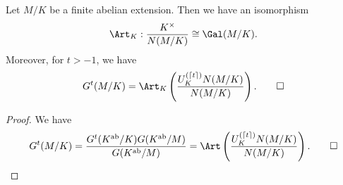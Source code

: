 \documentclass[a4paper]{article}
\begin{document}
\begin{cor}
  Let $M/K$ be a finite abelian extension. Then we have an isomorphism
  \[
    \Art_K: \frac{K^\times}{N(M/K)} \cong \Gal(M/K).
  \]
  Moreover, for $t > -1$, we have
  \[
    G^t(M/K) = \Art_K\left(\frac{U_K^{(\lceil t\rceil)}N(M/K)}{N(M/K)}\right). \qedhere
  \]
\end{cor}

\begin{proof}
  We have
  \[
    G^t(M/K) = \frac{G^t(K^{\mathrm{ab}}/K) G(K^{\mathrm{ab}}/M)}{G(K^{\mathrm{ab}}/M)} = \Art\left(\frac{U_K^{(\lceil t\rceil)}N(M/K)}{N(M/K)}\right).\qedhere
  \]
\end{proof} %


\printindex
\end{document}
